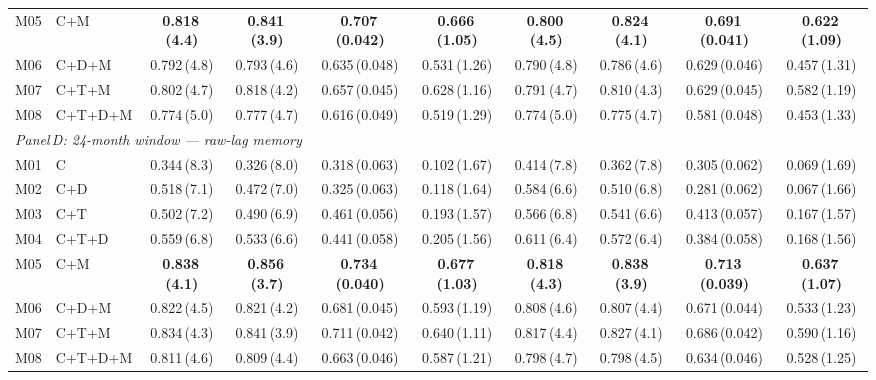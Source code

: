 \begin{table}
\begin{tabular}{@{}llcccccccc@{}}
M05 & C+M & \textbf{0.818\,(4.4)} & \textbf{0.841\,(3.9)} & \textbf{0.707\,(0.042)} & \textbf{0.666\,(1.05)} & \textbf{0.800\,(4.5)} & \textbf{0.824\,(4.1)} & \textbf{0.691\,(0.041)} & \textbf{0.622\,(1.09)} \\
M06 & C+D+M & 0.792\,(4.8) & 0.793\,(4.6) & 0.635\,(0.048) & 0.531\,(1.26) & 0.790\,(4.8) & 0.786\,(4.6) & 0.629\,(0.046) & 0.457\,(1.31) \\
M07 & C+T+M & 0.802\,(4.7) & 0.818\,(4.2) & 0.657\,(0.045) & 0.628\,(1.16) & 0.791\,(4.7) & 0.810\,(4.3) & 0.629\,(0.045) & 0.582\,(1.19) \\
M08 & C+T+D+M & 0.774\,(5.0) & 0.777\,(4.7) & 0.616\,(0.049) & 0.519\,(1.29) & 0.774\,(5.0) & 0.775\,(4.7) & 0.581\,(0.048) & 0.453\,(1.33) \\
\midrule
\multicolumn{10}{l}{\textit{Panel\,D: 24-month window --- raw-lag memory}} \\
\midrule
M01 & C & 0.344\,(8.3) & 0.326\,(8.0) & 0.318\,(0.063) & 0.102\,(1.67) & 0.414\,(7.8) & 0.362\,(7.8) & 0.305\,(0.062) & 0.069\,(1.69) \\
M02 & C+D & 0.518\,(7.1) & 0.472\,(7.0) & 0.325\,(0.063) & 0.118\,(1.64) & 0.584\,(6.6) & 0.510\,(6.8) & 0.281\,(0.062) & 0.067\,(1.66) \\
M03 & C+T & 0.502\,(7.2) & 0.490\,(6.9) & 0.461\,(0.056) & 0.193\,(1.57) & 0.566\,(6.8) & 0.541\,(6.6) & 0.413\,(0.057) & 0.167\,(1.57) \\
M04 & C+T+D & 0.559\,(6.8) & 0.533\,(6.6) & 0.441\,(0.058) & 0.205\,(1.56) & 0.611\,(6.4) & 0.572\,(6.4) & 0.384\,(0.058) & 0.168\,(1.56) \\
M05 & C+M & \textbf{0.838\,(4.1)} & \textbf{0.856\,(3.7)} & \textbf{0.734\,(0.040)} & \textbf{0.677\,(1.03)} & \textbf{0.818\,(4.3)} & \textbf{0.838\,(3.9)} & \textbf{0.713\,(0.039)} & \textbf{0.637\,(1.07)} \\
M06 & C+D+M & 0.822\,(4.5) & 0.821\,(4.2) & 0.681\,(0.045) & 0.593\,(1.19) & 0.808\,(4.6) & 0.807\,(4.4) & 0.671\,(0.044) & 0.533\,(1.23) \\
M07 & C+T+M & 0.834\,(4.3) & 0.841\,(3.9) & 0.711\,(0.042) & 0.640\,(1.11) & 0.817\,(4.4) & 0.827\,(4.1) & 0.686\,(0.042) & 0.590\,(1.16) \\
M08 & C+T+D+M & 0.811\,(4.6) & 0.809\,(4.4) & 0.663\,(0.046) & 0.587\,(1.21) & 0.798\,(4.7) & 0.798\,(4.5) & 0.634\,(0.046) & 0.528\,(1.25) \\
\bottomrule
\end{tabular}
\end{table}
